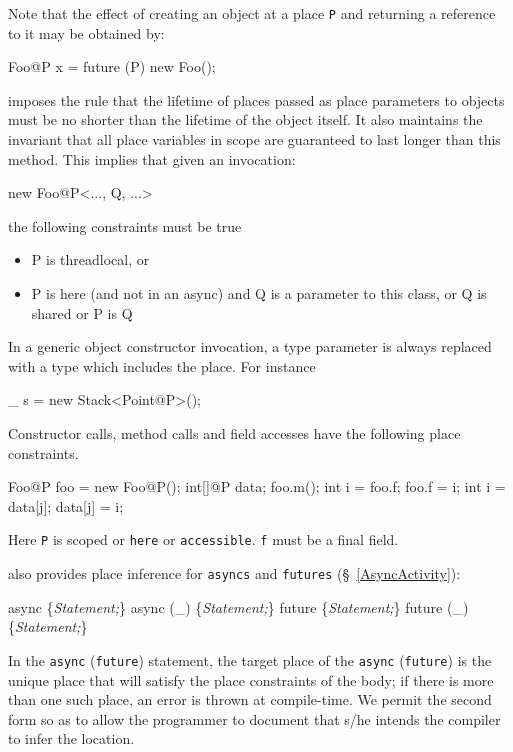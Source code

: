 Note that the effect of creating an object at a place {\tt P} and
returning a reference to it may be obtained by:
\begin{x10}
    Foo@P x = future (P) { new Foo();}
\end{x10}

{}\Xten{} imposes the rule that the lifetime of places passed as place
parameters to objects must be no shorter than the lifetime of the
object itself. It also maintains the invariant that all place variables
in scope are guaranteed to last longer than this method. This implies
that given an invocation:
\begin{x10}
    new Foo@P<..., Q, ...>
\end{x10}
\noindent the following constraints must be true
\begin{itemize}
\item {\cf P} is {\cf threadlocal},  or
\item {\cf P} is {\cf here} (and not in an {\cf async}) and {\cf Q} is a parameter to this class, or {\cf Q} is {\cf shared} or {\cf P} is {\cf Q}
\end{itemize}

In a generic object constructor invocation, a type parameter is always
replaced with a type which includes the place. For instance

\begin{x10}
    \_ s = new Stack<Point@P>();
\end{x10}

Constructor calls, method calls and field accesses have the following place constraints.
\begin{x10}
  Foo@P foo = new Foo@P();
  int[]@P data;
  foo.m();
  int i = foo.f;
  foo.f = i;
  int i = data[j];
  data[j] = i;
\end{x10}
Here {\tt P} is scoped or {\tt here} or {\tt accessible}. {\tt f}
must be a final field.

\Xten{} also provides place inference for {\tt asyncs} and {\tt futures} (\S~\ref{AsyncActivity}):

\begin{x10}
  async \{{\cf\em{}Statement;}\} 
  async (\_) \{{\cf\em{}Statement;}\}
  future \{{\cf\em{}Statement;}\} 
  future (\_) \{{\cf\em{}Statement;}\} 
\end{x10}

In the {\tt async} ({\tt future}) statement, the target place of the
{\tt async} ({\tt future}) is the unique place that will satisfy the
place constraints of the body; if there is more than one such place,
an error is thrown at compile-time. We permit the second form so as to
allow the programmer to document that s/he intends the compiler to
infer the location.

